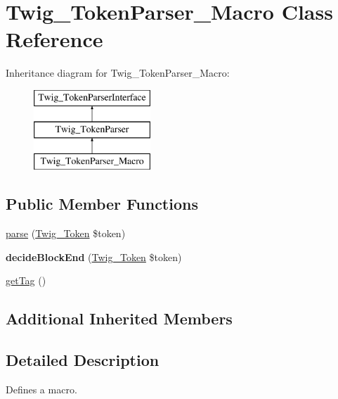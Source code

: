 \hypertarget{class_twig___token_parser___macro}{}\section{Twig\+\_\+\+Token\+Parser\+\_\+\+Macro Class Reference}
\label{class_twig___token_parser___macro}
Inheritance diagram for Twig\+\_\+\+Token\+Parser\+\_\+\+Macro\+:\begin{figure}[H]
\begin{center}
\leavevmode
\includegraphics[height=3.000000cm]{class_twig___token_parser___macro}
\end{center}
\end{figure}
\subsection*{Public Member Functions}
\begin{DoxyCompactItemize}
\item 
\hyperlink{class_twig___token_parser___macro_a5dfa2e269321584fb74e8b43dabe0efd}{parse} (\hyperlink{class_twig___token}{Twig\+\_\+\+Token} \$token)
\item 
\hypertarget{class_twig___token_parser___macro_aa976dc013d35c2813752149bacd88902}{}{\bfseries decide\+Block\+End} (\hyperlink{class_twig___token}{Twig\+\_\+\+Token} \$token)\label{class_twig___token_parser___macro_aa976dc013d35c2813752149bacd88902}

\item 
\hyperlink{class_twig___token_parser___macro_ab86ba36154b20e6bbfa3ba705f12f9d6}{get\+Tag} ()
\end{DoxyCompactItemize}
\subsection*{Additional Inherited Members}


\subsection{Detailed Description}
Defines a macro.


